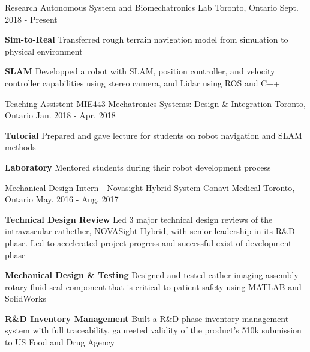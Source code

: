 \begin{cventries}
  \cventry
    {Research}
    {Autonomous System and Biomechatronics Lab}
    {Toronto, Ontario}
    {Sept. 2018 - Present}
    {
      \begin{cvitems}
        \item {
          \textbf{Sim-to-Real} Transferred rough terrain navigation model from simulation to physical environment
        \item {
          \textbf{SLAM} Developped a robot with SLAM, position controller, and velocity controller capabilities using stereo camera, and Lidar using ROS and C++
        }
        }
      \end{cvitems}
    }
  \cventry
    {Teaching Assistent}
    {MIE443 Mechatronics Systems: Design \& Integration}
    {Toronto, Ontario}
    {Jan. 2018 - Apr. 2018}
    {
      \begin{cvitems}
        \item {
          \textbf{Tutorial} Prepared and gave lecture for students on robot navigation and SLAM methods
        }
        \item {
          \textbf{Laboratory} Mentored students during their robot development process
        }
      \end{cvitems}
    }
  \cventry
    {Mechanical Design Intern - Novasight Hybrid System}
    {Conavi Medical} 
    {Toronto, Ontario}
    {May. 2016 - Aug. 2017}
    {
      \begin{cvitems}
        \item {
          \textbf{Technical Design Review} Led 3 major technical design reviews of the intravascular cathether, NOVASight Hybrid, with senior leadership in its R\&D phase. Led to accelerated project progress and successful exist of development phase
        }
        \item {
            \textbf{Mechanical Design \& Testing} Designed and tested cather imaging assembly rotary fluid seal component that is critical to patient safety using MATLAB and SolidWorks
        }
        \item {
            \textbf{R\&D Inventory Management} Built a R\&D phase inventory management system with full traceability, gaureeted validity of the product's 510k submission to US Food and Drug Agency
        }
      \end{cvitems}
    }  
\end{cventries}
